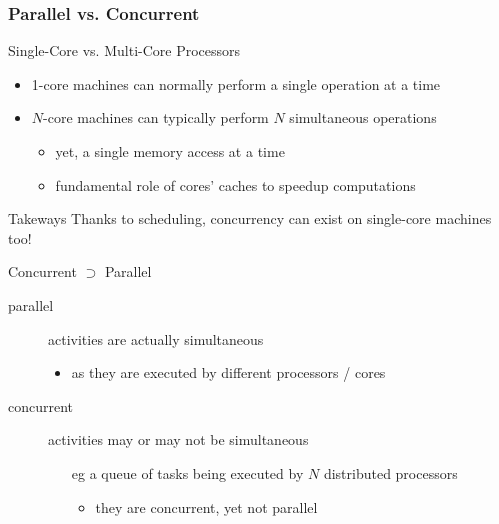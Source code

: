 \documentclass[presentation]{beamer}\mode<presentation>{\usetheme{AMSBolognaFC}}
\begin{document}
\begin{frame}[allowframebreaks]
    \frametitle{Parallel vs. Concurrent}

    \begin{block}{Single-Core vs. Multi-Core Processors}
        \begin{itemize}
            \item 1-core machines can normally perform a \alert{single operation} at a time
            \item $N$-core machines can typically perform \alert{$N$ simultaneous operations}
            \begin{itemize}
                \item yet, a single memory access at a time
                \item fundamental role of \alert{cores' caches} to speedup computations
            \end{itemize}
        \end{itemize}
    \end{block}

    \begin{alertblock}{Takeways}
        \centering
        Thanks to scheduling, concurrency can exist on single-core machines too!
    \end{alertblock}

    \begin{block}{Concurrent $\supset$ Parallel}
        \begin{description}
            \item[parallel] activities are actually simultaneous
            \begin{itemize}
                \item as they are executed by different processors / cores
            \end{itemize}

            \item[concurrent] activities may or may not be simultaneous
            \begin{itemize}
                \item[eg] a queue of tasks being executed by $N$ distributed processors
                \begin{itemize}
                    \item they are concurrent, yet not parallel
                \end{itemize}
            \end{itemize}
        \end{description}
    \end{block}
\end{frame}
\end{document}
